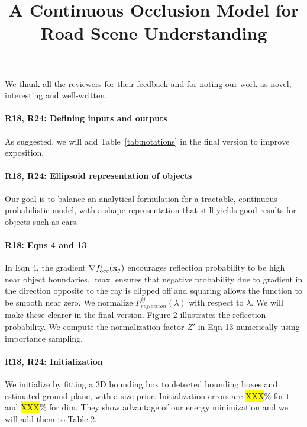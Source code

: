 \documentclass[10pt,twocolumn,letterpaper]{article}
\newcommand{\hili}[1]{\colorbox{yellow}{#1}}
\begin{document}
\title{A Continuous Occlusion Model for Road Scene Understanding}  %

\maketitle
\thispagestyle{empty}

We thank all the reviewers for their feedback and for noting our work as novel, interesting and well-written.

\vspace{-0.5cm}
\paragraph{R18, R24: Defining inputs and outputs} As suggested, we will add Table~\ref{tab:notations} in the final version to improve exposition.

\vspace{-0.5cm}
\paragraph{R18, R24: Ellipsoid representation of objects} Our goal is to balance an analytical formulation for a tractable, continuous probabilistic model, with a shape representation that still yields good results for objects such as cars.

\vspace{-0.5cm}
\paragraph{R18: Eqns 4 and 13}
In Eqn 4, the gradient $\nabla {f^i_{occ}}(\mathbf{x}_j)$ encourages reflection probability to be high near object boundaries, $\max$ ensures that negative probability due to gradient in the direction opposite to the ray is clipped off and squaring allows the function to be smooth near zero. We normalize $P^{ij}_{\textit{reflection}}(\lambda)$  with respect to $\lambda$. We will make these clearer in the final version. Figure 2 illustrates the reflection probability. We compute the normalization factor $Z'$ in Eqn 13 numerically using importance sampling.

\vspace{-0.5cm}
\paragraph{R18, R24: Initialization}
We initialize by fitting a 3D bounding box to detected bounding boxes and estimated ground plane, with a size prior. Initialization errors are \hili{XXX}\% for t and \hili{XXX}\% for dim. They show advantage of our energy minimization and we will add them to Table 2.
\end{document}
